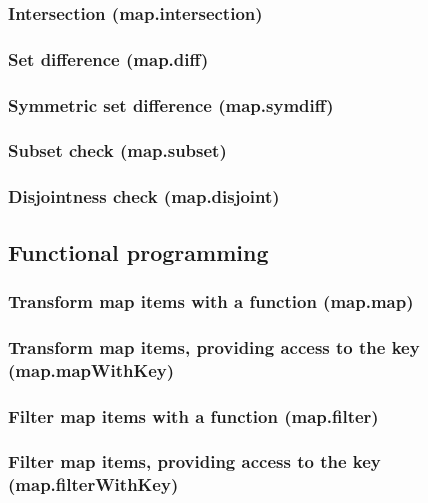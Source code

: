 \documentclass{article}
\theoremstyle{definition}
\begin{document}
\subsubsection{Intersection (map.intersection)}

\subsubsection{Set difference (map.diff)}

\subsubsection{Symmetric set difference (map.symdiff)}

\subsubsection{Subset check (map.subset)}

\subsubsection{Disjointness check (map.disjoint)}

\subsection{Functional programming}

\subsubsection{Transform map items with a function (map.map)}

\subsubsection{Transform map items, providing access to the key (map.mapWithKey)}

\subsubsection{Filter map items with a function (map.filter)}

\subsubsection{Filter map items, providing access to the key (map.filterWithKey)}
\end{document}
